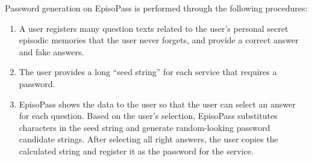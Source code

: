 \documentclass{sigchi}
\begin{document}
% 

Password generation on EpisoPass is performed through the following procedures:

\begin{enumerate}
\item A user registers many question texts related to the user's personal
secret episodic memories that the user never forgets,
and provide a correct answer and fake answers.

\item The user provides a long ``seed string'' for each service that requires
a password.

\item EpisoPass shows the data to the user so that
the user can select an answer for each question.
Based on the user's selection,
EpisoPass substitutes characters in the seed string and generate
random-looking password candidate strings.
After selecting all right answers,
the user copies the calculated string
and register it as the password for the service.
\end{enumerate}
\end{document}
